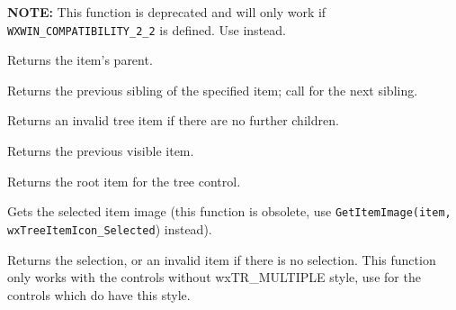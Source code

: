 {\bf NOTE:} This function is deprecated and will only work if {\tt WXWIN\_COMPATIBILITY\_2\_2}
is defined.  Use  instead.

Returns the item's parent.



\label{wxtreectrlgetprevsibling}


Returns the previous sibling of the specified item; call  for the next sibling.

Returns an invalid tree item if there are no further children.




\label{wxtreectrlgetprevvisible}


Returns the previous visible item.


\label{wxtreectrlgetrootitem}


Returns the root item for the tree control.


\label{wxtreectrlgetitemselectedimage}


Gets the selected item image (this function is obsolete, use
{\tt GetItemImage(item, wxTreeItemIcon\_Selected}) instead).


\label{wxtreectrlgetselection}


Returns the selection, or an invalid item if there is no selection.
This function only works with the controls without wxTR\_MULTIPLE style, use
 for the controls which do have
this style.


